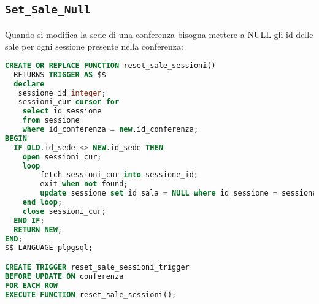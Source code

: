 \subsection{\texttt{Set\_Sale\_Null}}\label{trigger:setsalenull}
Quando si modifica la sede di una conferenza bisogna mettere a \textsc{NULL} gli id delle sale per ogni sessione presente nella conferenza:
\begin{lstlisting}[language=SQL,style=mystyle,caption={\texttt{Set\_Sale\_Null}}]
CREATE OR REPLACE FUNCTION reset_sale_sessioni()
  RETURNS TRIGGER AS $$
  declare
   sessione_id integer;
   sessioni_cur cursor for
    select id_sessione
    from sessione
    where id_conferenza = new.id_conferenza;
BEGIN
  IF OLD.id_sede <> NEW.id_sede THEN
    open sessioni_cur;
    loop
        fetch sessioni_cur into sessione_id;
        exit when not found;
        update sessione set id_sala = NULL where id_sessione = sessione_id;
    end loop;
    close sessioni_cur;
  END IF;
  RETURN NEW;
END;
$$ LANGUAGE plpgsql;

CREATE TRIGGER reset_sale_sessioni_trigger
BEFORE UPDATE ON conferenza
FOR EACH ROW
EXECUTE FUNCTION reset_sale_sessioni();
\end{lstlisting}